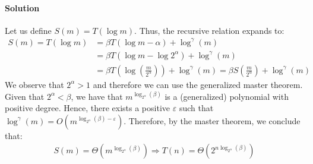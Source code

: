 \paragraph{Solution}
Let us define $S(m) = T(\log m)$. Thus, the recursive relation expands to:
\begin{equation*}
  \begin{split}
    S(m) = T(\log m) &= \beta T(\log m - \alpha) + \log^{\gamma}(m) \\
    &= \beta T(\log m - \log {2^\alpha}) + \log^{\gamma}(m) \\ 
    &= \beta T(\log \left( \frac{m}{2^{\alpha}} \right)) + \log^{\gamma}(m) = \beta S(\frac{m}{2^{\alpha}}) + \log^{\gamma}(m) 
  \end{split}
\end{equation*}
We observe that $2^{\alpha} > 1$ and therefore we can use the generalized master theorem. Given that $2^{\alpha} < \beta$, we have that $m^{\log_{2^\alpha}(\beta)}$ is a (generalized) polynomial with positive degree. Hence, there exists a positive $\varepsilon$ such that $\log^{\gamma}(m) = O(m^{\log_{2^\alpha}(\beta) - \varepsilon})$. Therefore, by the master theorem, we conclude that:
\begin{equation*}
  \begin{split}    
    S(m) = \Theta(m^{\log_{2^\alpha}(\beta)}) \Rightarrow T(n) = \Theta(2^{n \log_{2^\alpha}(\beta)})
  \end{split}
\end{equation*}
% 
%
% 






